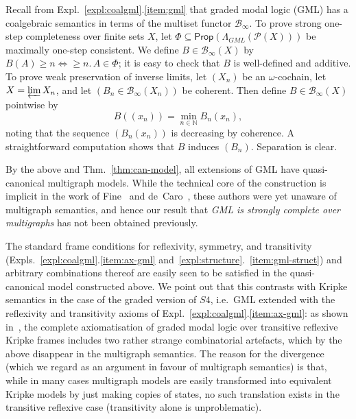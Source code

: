 \documentclass[proceedings]{stacs}
\theoremstyle{definition}
\theoremstyle{plain}
\newcommand{\Pow}{\mathcal{P}}
\newcommand{\Nat}{{\mathbb{N}}}
\newcommand{\Baginfty}{\mathcal{B}_\infty}
\newcommand{\Prop}{\mathsf{Prop}}
\DeclareMathOperator{\mge}{\ge}
\newcommand{\invlim}{\varprojlim}
\begin{document}
\begin{exa}\label{expl:gml-infty}
  Recall from Expl.~\ref{expl:coalgml}.\ref{item:gml} that graded
  modal logic (GML) has a coalgebraic semantics in terms of the multiset
  functor $\Baginfty$. To prove strong one-step completeness over
  finite sets $X$, let $\Phi\subseteq\Prop(\Lambda_{GML}(\Pow(X)))$ be
  maximally one-step consistent. We define $B\in\Baginfty(X)$ by
  $B(A)\ge n\iff\mge n.\,A\in\Phi$; it is easy to check that $B$ is
  well-defined and additive. To prove weak preservation of inverse
  limits, let $(X_n)$ be an $\omega$-cochain, let $X=\invlim X_n$, and
  let $(B_n\in\Baginfty(X_n))$ be coherent. Then define
  $B\in\Baginfty(X)$ pointwise by
\begin{equation*}
  B((x_n))=\min_{n\in\Nat}B_n(x_n),
\end{equation*}
noting that the sequence $(B_n(x_n))$ is decreasing by coherence. A
straightforward computation shows that $B$ induces $(B_n)$. Separation
is clear.

By the above and Thm.~\ref{thm:can-model}, all extensions of GML have
quasi-canonical multigraph models. While the technical core of the
construction is implicit in the work of Fine~\cite{Fine72} and
de~Caro~\cite{DeCaro88}, these authors were yet unaware of multigraph
semantics, and hence our result that \emph{GML is strongly complete
  over multigraphs} has not been obtained previously. 



The standard frame conditions for reflexivity, symmetry, and
transitivity (Expls.~\ref{expl:coalgml}.\ref{item:ax-gml}
and~\ref{expl:structure}.~\ref{item:gml-struct}) and arbitrary
combinations thereof are easily seen to be satisfied in the
quasi-canonical model constructed above. We point out that this
contrasts with Kripke semantics in the case of the graded version of
$S4$, i.e.\ GML extended with the reflexivity and transitivity axioms
of Expl.~\ref{expl:coalgml}.\ref{item:ax-gml}: as shown
in~\cite{FattorosiBarnabaCerrato88}, the complete axiomatisation of
graded modal logic over transitive reflexive Kripke frames includes
two rather strange combinatorial artefacts, which by the above
disappear in the multigraph semantics. The reason for the divergence
(which we regard as an argument in favour of multigraph semantics) is
that, while in many cases multigraph models are easily transformed
into equivalent Kripke models by just making copies of states, no such
translation exists in the transitive reflexive case (transitivity
alone is unproblematic).


\end{exa}
\end{document}
